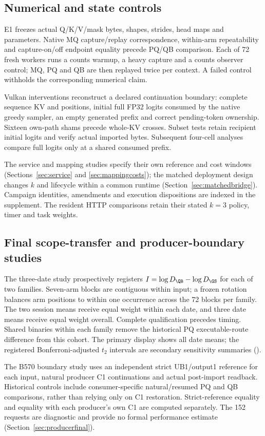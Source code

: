 \subsection{Numerical and state controls}
E1 freezes actual Q/K/V/mask bytes, shapes, strides, head maps and parameters. Native MQ capture/replay correspondence, within-arm repeatability and capture-on/off endpoint equality precede PQ/QB comparison. Each of 72 fresh workers runs a counts warmup, a heavy capture and a counts observer control; MQ, PQ and QB are then replayed twice per context. A failed control withholds the corresponding numerical claim.

Vulkan interventions reconstruct a declared continuation boundary: complete sequence KV and positions, initial full FP32 logits consumed by the native greedy sampler, an empty generated prefix and correct pending-token ownership. Sixteen own-path shams precede whole-KV crosses. Subset tests retain recipient initial logits and verify actual imported bytes. Subsequent four-cell analyses compare full logits only at a shared consumed prefix.

The service and mapping studies specify their own reference and cost windows (Sections~\ref{sec:service} and \ref{sec:mappingcosts}); the matched deployment design changes $k$ and lifecycle within a common runtime (Section~\ref{sec:matchedbridge}). Campaign identities, amendments and execution dispositions are indexed in the supplement. The resident HTTP comparisons retain their stated $k=3$ policy, timer and task weights.


\subsection{Final scope-transfer and producer-boundary studies}
The three-date study prospectively registers $I=\log D_{\QB}-\log D_{\GS}$ for each of two families. Seven-arm blocks are contiguous within input; a frozen rotation balances arm positions to within one occurrence across the 72 blocks per family. The two session means receive equal weight within each date, and three date means receive equal weight overall. Complete qualification precedes timing. Shared binaries within each family remove the historical PQ executable-route difference from this cohort. The primary display shows all date means; the registered Bonferroni-adjusted $t_2$ intervals are secondary sensitivity summaries ().

The B570 boundary study uses an independent strict UB1/output1 reference for each input, natural producer C1 continuations and actual post-import readback. Historical controls include consumer-specific natural/resumed PQ and QB comparisons, rather than relying only on C1 restoration. Strict-reference equality and equality with each producer's own C1 are computed separately. The 152 requests are diagnostic and provide no formal performance estimate (Section~\ref{sec:producerfinal}).
